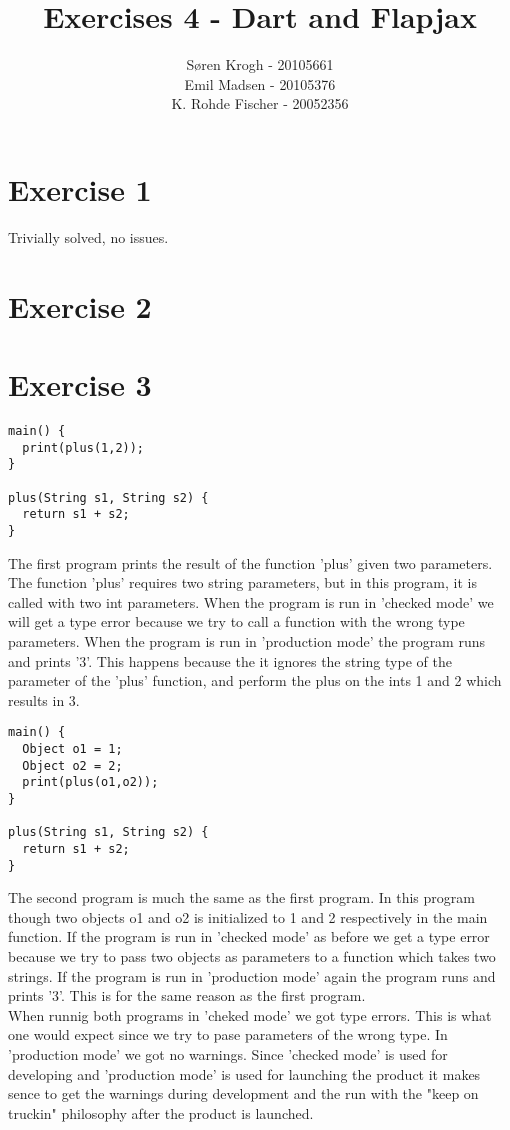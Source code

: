 \documentclass[a4paper,10pt]{article}
\author{
Søren Krogh -  20105661 \\
Emil Madsen - 20105376  \\
K. Rohde Fischer - 20052356\\}
\title{Exercises 4 - Dart and Flapjax}
\begin{document}
\maketitle

\section*{Exercise 1}
Trivially solved, no issues.

\section*{Exercise 2}

\section*{Exercise 3}
\begin{verbatim}
main() {
  print(plus(1,2));
}

plus(String s1, String s2) {
  return s1 + s2;
}
\end{verbatim}
The first program prints the result of the function 'plus' given two parameters. The function 'plus' requires two string parameters, but in this program, it is called with two int parameters. When the program is run in 'checked mode' we will get a type error because we try to call a function with the wrong type parameters. When the program is run in 'production mode' the program runs and prints '3'. This happens because the it ignores the string type of the parameter of the 'plus' function, and perform the plus on the ints 1 and 2 which results in 3.

\begin{verbatim}
main() {
  Object o1 = 1;
  Object o2 = 2;
  print(plus(o1,o2));
}

plus(String s1, String s2) {
  return s1 + s2;
}
\end{verbatim}
The second program is much the same as the first program. In this program though two objects o1 and o2 is initialized to 1 and 2 respectively in the main function. If the program is run in 'checked mode' as before we get a type error because we try to pass two objects as parameters to a function which takes two strings. If the program is run in 'production mode' again the program runs and prints '3'. This is for the same reason as the first program.\\

When runnig both programs in 'cheked mode' we got type errors. This is what one would expect since we try to pase parameters of the wrong type. In 'production mode' we got no warnings. Since 'checked mode' is used for developing and 'production mode' is used for launching the product it makes sence to get the warnings during development and the run with the "keep on truckin" philosophy after the product is launched.\\
\end{document}

